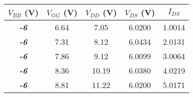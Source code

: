 \begin{tabular}{@{}ccccc@{}}
\toprule
\textbf{$V_{BB}$ (V)} & \multicolumn{1}{l}{\textbf{$V_{GG}$ (V)}} & \textbf{$V_{DD}$ (V)} & \textbf{$V_{DS}$ (V)} & \textbf{$I_{DS}$} \\ \midrule
\textit{\textbf{-6}}     &  6.64     & 7.05      & 6.0200      &1.0014       \\
\textit{\textbf{-6}}     &  7.31     & 8.12      & 6.0434       & 2.0131      \\
\textit{\textbf{-6}}     &  7.86     & 9.12      & 6.0099      & 3.0064      \\
\textit{\textbf{-6}}     &  8.36     & 10.19      & 6.0380       & 4.0219       \\
\textit{\textbf{-6}}     &  8.81     & 11.22      & 6.0200      & 5.0171      \\ \bottomrule
\end{tabular}